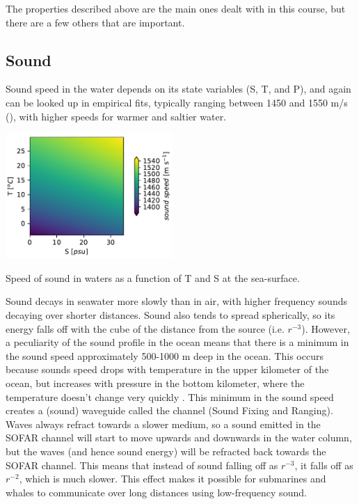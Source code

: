 The properties described above are the main ones dealt with in this course, but there are a few others that are important.  

\subsection{Sound}

Sound speed in the water depends on its state variables (S, T, and P), and again can be looked up in empirical fits, typically ranging between 1450 and 1550 m/s (), with higher speeds for warmer and saltier water.

 \begin{marginfigure}
 \begin{center}
    \includegraphics[width=2.5in]{./figs/SoundSpeed.pdf}
    \caption{Speed of sound in waters as a function of T and S at the sea-surface. }
    \label{fig:SoundSpeed}  
 \end{center}
\end{marginfigure}

Sound decays in seawater more slowly than in air, with higher frequency sounds decaying over shorter distances.  Sound also tends to spread spherically, so its energy falls off with the cube of the distance from the source (i.e. $r^{-3}$).  However, a peculiarity of the sound profile in the ocean means that there is a minimum in the sound speed approximately 500-1000 m deep in the ocean.  This occurs because sounds speed drops with temperature in the upper kilometer of the ocean, but increases with pressure in the bottom kilometer, where the temperature doesn't change very quickly .  This minimum in the sound speed creates a (sound) waveguide called the  channel (Sound Fixing and Ranging).  Waves always refract towards a slower medium, so a sound emitted in the SOFAR channel will start to move upwards and downwards in the water column, but the waves (and hence sound energy) will be refracted back towards the SOFAR channel.  This means that instead of sound falling off as $r^{-3}$, it falls off as $r^{-2}$, which is much slower.  This effect makes it possible for submarines and whales to communicate over long distances using low-frequency sound.  

